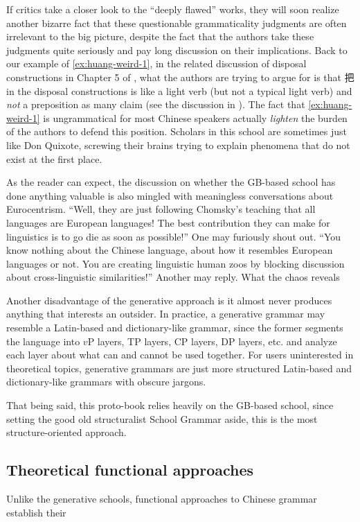 If critics take a closer look to the ``deeply flawed'' works, they will soon realize another bizarre fact that 
these questionable grammaticality judgments are often irrelevant to the big picture, despite the fact that 
the authors take these judgments quite seriously and pay long discussion on their implications.
Back to our example of \eqref{ex:huang-weird-1}, in the related discussion of disposal constructions in 
Chapter 5 of \citet{huang2013}, what the authors are trying to argue for is that 把 in the disposal constructions 
is like a light verb (but not a typical light verb) and \emph{not} a preposition as many claim 
(see the discussion in ). The fact that \eqref{ex:huang-weird-1} is ungrammatical 
for most Chinese speakers actually \emph{lighten} the burden of the authors to defend this position.
Scholars in this school are sometimes just like Don Quixote, screwing their brains trying to explain
phenomena that do not exist at the first place.

As the reader can expect, the discussion on whether the GB-based school has done anything valuable 
is also mingled with meaningless conversations about Eurocentrism. ``Well, they are just following 
Chomsky's teaching that all languages are European languages! The best contribution they can make for 
linguistics is to go die as soon as possible!'' One may furiously shout out. ``You know nothing about 
the Chinese language, about how it resembles European languages or not. You are creating linguistic 
human zoos by blocking discussion about cross-linguistic similarities!'' Another may reply.
What the chaos reveals %

Another disadvantage of the generative approach is it almost never produces anything that interests an outsider.
In practice, a generative grammar may resemble a Latin-based and dictionary-like grammar, since the former 
segments the language into $v$P layers, TP layers, CP layers, DP layers, etc. and analyze each layer 
about what can and cannot be used together. For users uninterested in theoretical topics,
generative grammars are just more structured Latin-based and dictionary-like grammars with obscure jargons.

That being said, this proto-book relies heavily on the GB-based school, since setting the good old structuralist
School Grammar aside, this is the most structure-oriented approach.

\subsection{Theoretical functional approaches}

Unlike the generative schools, functional approaches to Chinese grammar establish their 

